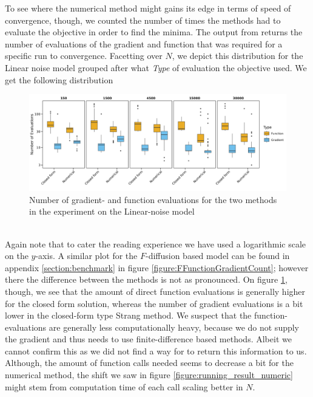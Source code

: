 To see where the numerical method might gains its edge in terms of speed of convergence, though, we counted the number of times the methods had to evaluate the objective in order to find the minima. The  output from  returns the number of evaluations of the gradient and function that was required for a specific run to convergence. Facetting over $N$, we depict this distribution for the Linear noise model grouped after what \textit{Type} of evaluation the objective used. We get the following distribution
\begin{figure}[h!]
    \begin{center}
    \includegraphics[scale = .08]{figures/function_gradient_count_Linear_plot.jpeg}     
    \caption{Number of gradient- and function evaluations for the two methods in the experiment on the Linear-noise model}
    \label{figure:linearFunctionGradientCount}   
    \end{center}
\end{figure}\\
Again note that to cater the reading experience we have used a logarithmic scale on the $y$-axis. A similar plot for the $F$-diffusion based model can be found in appendix \ref{section:benchmark} in figure \ref{figure:FFunctionGradientCount}; however there the difference between the methods is not as pronounced. On figure \ref{figure:linearFunctionGradientCount}, though, we see that the amount of direct function evaluations is generally higher for the closed form solution, whereas the number of gradient evaluations is a bit lower in the closed-form type Strang method. We suspect that the function-evaluations are generally less computationally heavy, because we do not supply the gradient and  thus needs to use finite-difference based methods. Albeit we cannot confirm this as we did not find a way for  to return this information to us. Although, the amount of function calls needed seems to decrease a bit for the numerical method, the shift we saw in figure \ref{figure:running_result_numeric} might stem from computation time of each call scaling better in $N$.

